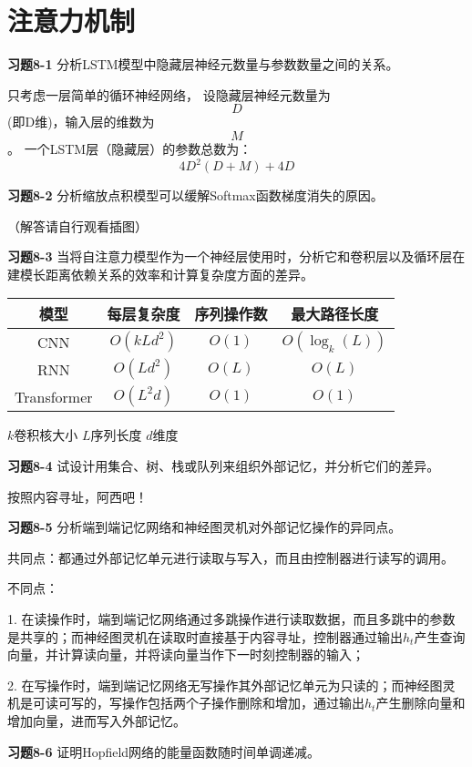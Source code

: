 \section{注意力机制}

\noindent\textbf{习题8-1} 分析LSTM模型中隐藏层神经元数量与参数数量之间的关系。

只考虑一层简单的循环神经网络，
设隐藏层神经元数量为$$D$$ (即D维)，输入层的维数为$$M$$。
一个LSTM层（隐藏层）的参数总数为：$$4D^2(D+M)+4D$$

\noindent\textbf{习题8-2} 分析缩放点积模型可以缓解Softmax函数梯度消失的原因。

（解答请自行观看插图）

\noindent\textbf{习题8-3} 当将自注意力模型作为一个神经层使用时，分析它和卷积层以及循环层在建模长距离依赖关系的效率和计算复杂度方面的差异。

\begin{table}[htb]
\begin{tabular}{|c|c|c|c|}
\hline
模型 & 每层复杂度 & 序列操作数 & 最大路径长度 \\
\hline
CNN & $O(kLd^2)$ & $O(1)$ & $O(\log_k(L))$ \\
\hline
RNN & $O(Ld^2)$ & $O(L)$ & $O(L)$ \\
\hline
Transformer & $O(L^2d)$ & $O(1)$ & $O(1)$ \\
\hline
\end{tabular}

$k$卷积核大小 \quad $L$序列长度 \quad $d$维度
\end{table}


\noindent\textbf{习题8-4} 试设计用集合、树、栈或队列来组织外部记忆，并分析它们的差异。

按照内容寻址，阿西吧！

\noindent\textbf{习题8-5} 分析端到端记忆网络和神经图灵机对外部记忆操作的异同点。

共同点：都通过外部记忆单元进行读取与写入，而且由控制器进行读写的调用。

不同点：

1. 在读操作时，端到端记忆网络通过多跳操作进行读取数据，而且多跳中的参数是共享的；而神经图灵机在读取时直接基于内容寻址，控制器通过输出$h_t$产生查询向量，并计算读向量，并将读向量当作下一时刻控制器的输入；

2. 在写操作时，端到端记忆网络无写操作其外部记忆单元为只读的；而神经图灵机是可读可写的，写操作包括两个子操作删除和增加，通过输出$h_t$产生删除向量和增加向量，进而写入外部记忆。

\noindent\textbf{习题8-6} 证明Hopfield网络的能量函数随时间单调递减。

